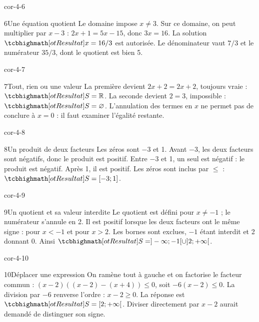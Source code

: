 \begin{blocLivre}{cor-4-6}
\begin{corrige}{6}{Une équation quotient}
Le domaine impose $x\ne3$. Sur ce domaine, on peut multiplier par $x-3$ : $2x+1=5x-15$, donc $3x=16$. La solution $\res{x=16/3}$ est autorisée. Le dénominateur vaut $7/3$ et le numérateur $35/3$, dont le quotient est bien 5.
\end{corrige}
\end{blocLivre}
\begin{blocLivre}{cor-4-7}
\begin{corrige}{7}{Tout, rien ou une valeur}
La première devient $2x+2=2x+2$, toujours vraie : $\res{S=\mathbb R}$. La seconde devient $2=3$, impossible : $\res{S=\varnothing}$. L’annulation des termes en $x$ ne permet pas de conclure à $x=0$ : il faut examiner l’égalité restante.
\end{corrige}
\end{blocLivre}
\begin{blocLivre}{cor-4-8}
\begin{corrige}{8}{Un produit de deux facteurs}
Les zéros sont $-3$ et 1. Avant $-3$, les deux facteurs sont négatifs, donc le produit est positif. Entre $-3$ et 1, un seul est négatif : le produit est négatif. Après 1, il est positif. Les zéros sont inclus par $\le$ : $\res{S=[-3;1]}$.
\label{fig-cor-4-8}
\end{corrige}
\end{blocLivre}
\begin{blocLivre}{cor-4-9}
\begin{corrige}{9}{Un quotient et sa valeur interdite}
Le quotient est défini pour $x\ne-1$ ; le numérateur s’annule en 2. Il est positif lorsque les deux facteurs ont le même signe : pour $x<-1$ et pour $x>2$. Les bornes sont exclues, $-1$ étant interdit et 2 donnant 0. Ainsi $\res{S=]-\infty;-1[\cup]2;+\infty[}$.
\label{fig-cor-4-9}
\end{corrige}
\end{blocLivre}
\begin{blocLivre}{cor-4-10}
\begin{corrige}{10}{Déplacer une expression}
On ramène tout à gauche et on factorise le facteur commun : $(x-2)((x-2)-(x+4))\le0$, soit $-6(x-2)\le0$. La division par $-6$ renverse l’ordre : $x-2\ge0$. La réponse est $\res{S=[2;+\infty[}$. Diviser directement par $x-2$ aurait demandé de distinguer son signe.
\end{corrige}
\end{blocLivre}
